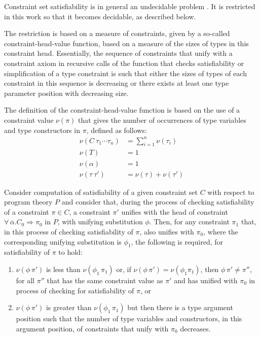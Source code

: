 \documentclass[review]{elsarticle}
\begin{document}

Constraint set satisfiability is in general an undecidable problem
\cite{Smith-PhD-Thesis91}. It is restricted in this work so that it
becomes decidable, as described below.

The restriction is based on a measure of constraints, given by a
so-called constraint-head-value function, based on a measure of the
sizes of types in this constraint head. Essentially, the sequence of
constraints that unify with a constraint axiom in recursive calls of
the function that checks satisfiability or simplification of a type
constraint is such that either the sizes of types of each constraint
in this sequence is decreasing or there exists at least one type
parameter position with decreasing size.

The definition of the constraint-head-value function is based on the
use of a constraint value $\nu(\pi)$ that gives the number of
occurrences of type variables and type constructors in $\pi$, defined
as follows:
  \[ \begin{array}{ll}
        \nu(C\: \tau_1 \cdots \tau_n) & = \sum_{i=1}^n \nu(\tau_i)\\
        \nu(T)                        & = 1\\
        \nu(\alpha)                   & = 1\\
        \nu(\tau\: \tau')             & = \nu(\tau) + \nu(\tau')
     \end{array}
  \]

Consider computation of satisfiability of a given constraint set $C$
with respect to program theory $P$ and consider that, during the
process of checking satisfiability of a constraint $\pi\in C$, a
constraint $\pi'$ unifies with the head of constraint $\forall\,
\overline{\alpha}.C_0 \Rightarrow \pi_0$ in $P$, with unifying
substitution $\phi$. Then, for any constraint $\pi_1$ that, in this
process of checking satisfiability of $\pi$, also unifies with
$\pi_0$, where the corresponding unifying substitution is $\phi_1$,
the following is required, for satisfiability of $\pi$ to hold:

\begin{enumerate}
\item $\nu(\phi\,\pi')$ is less than $\nu(\phi_1\,\pi_1)$ or, if
  $\nu(\phi\, \pi')=\nu(\phi_1 \pi_1)$, then $\phi\,\pi' \not= \pi''$,
  for all $\pi''$ that has the same constraint value as $\pi'$ and has
  unified with $\pi_0$ in process of checking for satisfiability of
  $\pi$, or

\item $\nu(\phi\,\pi')$ is greater than $\nu(\phi_1\,\pi_1)$ but then
  there is a type argument position such that the number of type
  variables and constructors, in this argument position, of
  constraints that unify with $\pi_0$ decreases.

\end{enumerate}
\end{document}
